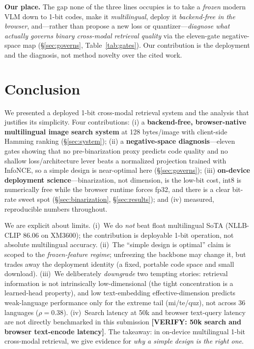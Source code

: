 \documentclass[letterpaper]{article} %
\newcommand{\verify}[1]{\textbf{[VERIFY: #1]}}
\begin{document}
\textbf{Our place.} The gap none of the three lines occupies is to take a \emph{frozen} modern VLM down
to 1-bit codes, make it \emph{multilingual}, deploy it \emph{backend-free in the browser}, and---rather
than propose a new loss or quantizer---\emph{diagnose what actually governs binary cross-modal
retrieval quality} via the eleven-gate negative-space map (\S\ref{sec:governs},
Table~\ref{tab:gates}). Our contribution is the deployment and the diagnosis, not method novelty over
the cited work.

\section{Conclusion}
\label{sec:conclusion}
We presented a deployed 1-bit cross-modal retrieval system and the analysis that justifies its
simplicity. Four contributions: (i) a \textbf{backend-free, browser-native multilingual image search
system} at 128 bytes/image with client-side Hamming ranking (\S\ref{sec:system}); (ii) a
\textbf{negative-space diagnosis}---eleven gates showing that no pre-binarization proxy predicts code
quality and no shallow loss/architecture lever beats a normalized projection trained with InfoNCE, so
a simple design is near-optimal here (\S\ref{sec:governs}); (iii) \textbf{on-device deployment
science}---binarization, not dimension, is the low-bit cost, int8 is numerically free while the
browser runtime forces fp32, and there is a clear bit-rate sweet spot (\S\ref{sec:binarization},
\S\ref{sec:results}); and (iv) measured, reproducible numbers throughout.

We are explicit about limits. (i)~We do \emph{not} beat float multilingual SoTA (NLLB-CLIP 86.06 on
XM3600); the contribution is deployable 1-bit operation, not absolute multilingual accuracy.
(ii)~The ``simple design is optimal'' claim is scoped to the \emph{frozen-feature regime}; unfreezing
the backbone may change it, but trades away the deployment identity (a fixed, portable code space and
small download). (iii)~We deliberately \emph{downgrade} two tempting stories: retrieval information is
not intrinsically low-dimensional (the tight concentration is a learned-head property), and low
text-embedding effective-dimension predicts weak-language performance only for the extreme tail
(mi/te/quz), not across 36 languages ($\rho\!=\!0.38$). (iv)~Search latency at 50k and browser
text-query latency are not directly benchmarked in this submission \verify{50k search and browser
text-encode latency}. The takeaway: in on-device multilingual 1-bit cross-modal retrieval, we give
evidence for \emph{why a simple design is the right one}.
\end{document}
